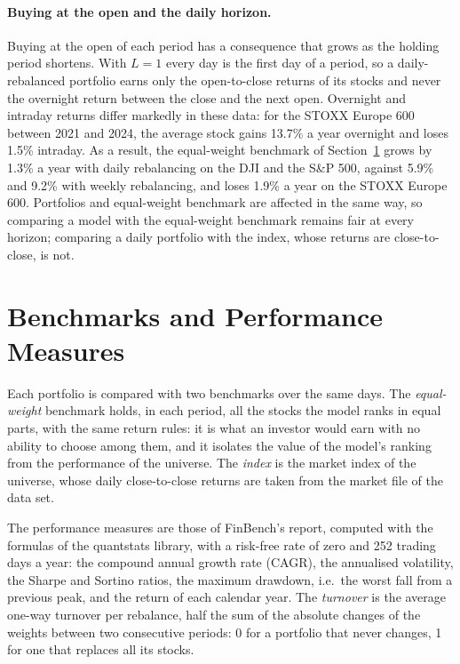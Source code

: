 \paragraph{Buying at the open and the daily horizon.} Buying at the open of each period has a consequence that grows as the holding period shortens. With $L = 1$ every day is the first day of a period, so a daily-rebalanced portfolio earns only the open-to-close returns of its stocks and never the overnight return between the close and the next open. Overnight and intraday returns differ markedly in these data: for the STOXX Europe 600 between 2021 and 2024, the average stock gains 13.7\% a year overnight and loses 1.5\% intraday. As a result, the equal-weight benchmark of Section~\ref{sec:pf_metrics} grows by 1.3\% a year with daily rebalancing on the DJI and the S\&P 500, against 5.9\% and 9.2\% with weekly rebalancing, and loses 1.9\% a year on the STOXX Europe 600. Portfolios and equal-weight benchmark are affected in the same way, so comparing a model with the equal-weight benchmark remains fair at every horizon; comparing a daily portfolio with the index, whose returns are close-to-close, is not.

\section{Benchmarks and Performance Measures}
\label{sec:pf_metrics}

Each portfolio is compared with two benchmarks over the same days. The \emph{equal-weight} benchmark holds, in each period, all the stocks the model ranks in equal parts, with the same return rules: it is what an investor would earn with no ability to choose among them, and it isolates the value of the model's ranking from the performance of the universe. The \emph{index} is the market index of the universe, whose daily close-to-close returns are taken from the market file of the data set.

The performance measures are those of FinBench's report, computed with the formulas of the quantstats library, with a risk-free rate of zero and 252 trading days a year: the compound annual growth rate (CAGR), the annualised volatility, the Sharpe and Sortino ratios, the maximum drawdown, i.e.\ the worst fall from a previous peak, and the return of each calendar year. The \emph{turnover} is the average one-way turnover per rebalance, half the sum of the absolute changes of the weights between two consecutive periods: 0 for a portfolio that never changes, 1 for one that replaces all its stocks.

